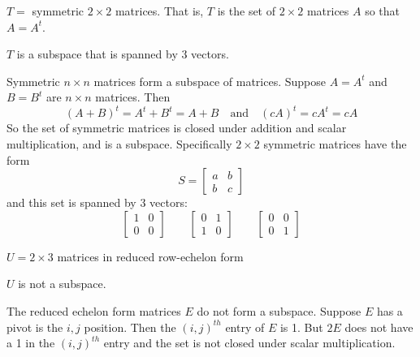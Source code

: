 \documentclass{ximera}
\begin{document}
\begin{exercise}\label{C5.2.3B}

$T = $ symmetric $2\times 2$ matrices.  That is, $T$ is the set of $2\times 2$ matrices $A$ so that $A=A^t$.

\begin{solution}

\ans $T$ is a subspace that is spanned by $3$ vectors.

\soln
Symmetric $n\times n$ matrices form a subspace of matrices.  Suppose $A= A^t$ and $B = B^t$ are $n\times n$ matrices.  Then
\[
(A+B)^t = A^t + B^t = A + B  \quad\mbox{and} \quad (cA)^t = cA^t = cA
\]
So the set of symmetric matrices is closed under addition and scalar multiplication, and is a subspace. Specifically $2\times 2$ symmetric matrices have the form  
\[
S = \begin{bmatrix}
 a & b \\  b &c  
\end{bmatrix}
\]
and this set is spanned by $3$ vectors:
\[
\begin{bmatrix}
 1 & 0 \\  0 &0  
\end{bmatrix} 
\qquad
\begin{bmatrix}
 0 & 1 \\  1 &0  
\end{bmatrix}
\qquad
\begin{bmatrix}
 0 & 0 \\  0 & 1  
\end{bmatrix}
\]
\end{solution}
\end{exercise}

\begin{exercise}\label{C5.2.3C}
$U = 2\times 3$ matrices in reduced row-echelon form

\begin{solution}

\ans $U$ is not a subspace.

\soln
The reduced echelon form matrices $E$ do not form a subspace.  Suppose $E$ has a pivot is the $i,j$ position.  Then the $(i,j)^{th}$ entry of $E$ is 1.  But $2E$ does not have a 1 in the $(i,j)^{th}$ entry and the set is not closed under scalar multiplication.
\end{solution}
\end{exercise}
\end{document}

